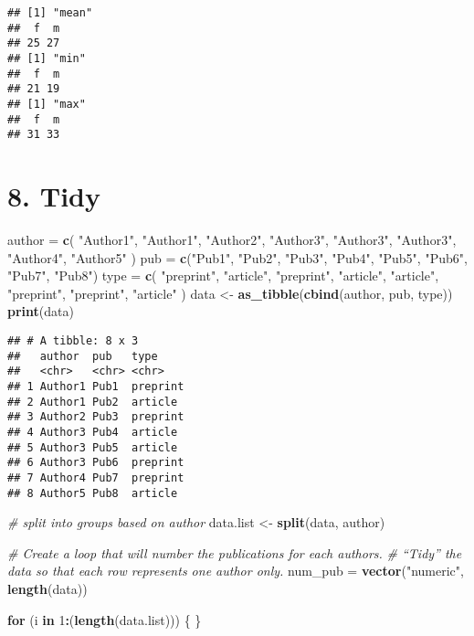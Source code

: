 \documentclass[]{article}
\newenvironment{Shaded}{\begin{snugshade}}{\end{snugshade}}
\newcommand{\CommentTok}[1]{\textcolor[rgb]{0.56,0.35,0.01}{\textit{#1}}}
\newcommand{\ControlFlowTok}[1]{\textcolor[rgb]{0.13,0.29,0.53}{\textbf{#1}}}
\newcommand{\DecValTok}[1]{\textcolor[rgb]{0.00,0.00,0.81}{#1}}
\newcommand{\KeywordTok}[1]{\textcolor[rgb]{0.13,0.29,0.53}{\textbf{#1}}}
\newcommand{\NormalTok}[1]{#1}
\newcommand{\OperatorTok}[1]{\textcolor[rgb]{0.81,0.36,0.00}{\textbf{#1}}}
\newcommand{\StringTok}[1]{\textcolor[rgb]{0.31,0.60,0.02}{#1}}
\begin{document}
\begin{verbatim}
## [1] "mean"
##  f  m 
## 25 27 
## [1] "min"
##  f  m 
## 21 19 
## [1] "max"
##  f  m 
## 31 33
\end{verbatim}

\hypertarget{tidy}{%
\section{8. Tidy}\label{tidy}}

\begin{Shaded}
\begin{Highlighting}[]
\NormalTok{author =}\StringTok{ }\KeywordTok{c}\NormalTok{(}
  \StringTok{"Author1"}\NormalTok{,}
  \StringTok{"Author1"}\NormalTok{,}
  \StringTok{"Author2"}\NormalTok{,}
  \StringTok{"Author3"}\NormalTok{,}
  \StringTok{"Author3"}\NormalTok{,}
  \StringTok{"Author3"}\NormalTok{,}
  \StringTok{"Author4"}\NormalTok{,}
  \StringTok{"Author5"}
\NormalTok{)}
\NormalTok{pub =}\StringTok{ }\KeywordTok{c}\NormalTok{(}\StringTok{"Pub1"}\NormalTok{, }\StringTok{"Pub2"}\NormalTok{, }\StringTok{"Pub3"}\NormalTok{, }\StringTok{"Pub4"}\NormalTok{,}
        \StringTok{"Pub5"}\NormalTok{, }\StringTok{"Pub6"}\NormalTok{, }\StringTok{"Pub7"}\NormalTok{, }\StringTok{"Pub8"}\NormalTok{)}
\NormalTok{type =}\StringTok{ }\KeywordTok{c}\NormalTok{(}
  \StringTok{"preprint"}\NormalTok{,}
  \StringTok{"article"}\NormalTok{,}
  \StringTok{"preprint"}\NormalTok{,}
  \StringTok{"article"}\NormalTok{,}
  \StringTok{"article"}\NormalTok{,}
  \StringTok{"preprint"}\NormalTok{,}
  \StringTok{"preprint"}\NormalTok{,}
  \StringTok{"article"}
\NormalTok{)}
\NormalTok{data <-}\StringTok{ }\KeywordTok{as_tibble}\NormalTok{(}\KeywordTok{cbind}\NormalTok{(author, pub, type))}
\KeywordTok{print}\NormalTok{(data)}
\end{Highlighting}
\end{Shaded}

\begin{verbatim}
## # A tibble: 8 x 3
##   author  pub   type    
##   <chr>   <chr> <chr>   
## 1 Author1 Pub1  preprint
## 2 Author1 Pub2  article 
## 3 Author2 Pub3  preprint
## 4 Author3 Pub4  article 
## 5 Author3 Pub5  article 
## 6 Author3 Pub6  preprint
## 7 Author4 Pub7  preprint
## 8 Author5 Pub8  article
\end{verbatim}

\begin{Shaded}
\begin{Highlighting}[]
\CommentTok{# split into groups based on author}
\NormalTok{data.list <-}\StringTok{ }\KeywordTok{split}\NormalTok{(data, author)}

\CommentTok{# Create a loop that will number the publications for each authors. }
\CommentTok{# “Tidy” the data so that each row represents one author only.}
\NormalTok{num_pub =}\StringTok{ }\KeywordTok{vector}\NormalTok{(}\StringTok{"numeric"}\NormalTok{, }\KeywordTok{length}\NormalTok{(data))}

\ControlFlowTok{for}\NormalTok{ (i }\ControlFlowTok{in} \DecValTok{1}\OperatorTok{:}\NormalTok{(}\KeywordTok{length}\NormalTok{(data.list))) \{}
\NormalTok{\}}
\end{Highlighting}
\end{Shaded}
\end{document}
